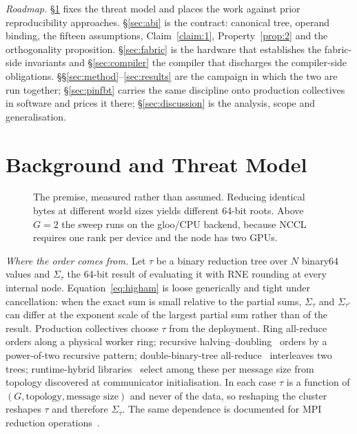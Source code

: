 \documentclass[journal,10pt]{IEEEtran}
\theoremstyle{plain}
\theoremstyle{definition}
\theoremstyle{remark}
\begin{document}
\emph{Roadmap.} \S\ref{sec:background} fixes the threat model and places the
work against prior reproducibility approaches. \S\ref{sec:abi} is the
contract: canonical tree, operand binding, the fifteen assumptions,
Claim~\ref{claim:1}, Property~\ref{prop:2} and the orthogonality proposition.
\S\ref{sec:fabric} is the hardware that establishes the fabric-side
invariants and \S\ref{sec:compiler} the compiler that discharges the
compiler-side obligations. \S\S\ref{sec:method}--\ref{sec:results} are the
campaign in which the two are run together; \S\ref{sec:pinfbt} carries the
same discipline onto production collectives in software and prices it there;
\S\ref{sec:discussion} is the analysis, scope and generalisation.




\section{Background and Threat Model}\label{sec:background}

\begin{figure}[!t]\centering

\caption{The premise, measured rather than assumed. Reducing identical bytes at different world sizes yields different 64-bit roots. Above $G{=}2$ the sweep runs on the gloo/CPU backend, because NCCL requires one rank per device and the node has two GPUs.}\label{fig:premise}
\end{figure}


\emph{Where the order comes from.} Let $\tau$ be a binary reduction tree over
$N$ binary64 values and $\Sigma_\tau$ the 64-bit result of evaluating it with
RNE rounding at every internal node. Equation~\eqref{eq:higham} is loose
generically and tight under cancellation: when the exact sum is small
relative to the partial sums, $\Sigma_\tau$ and $\Sigma_{\tau'}$ can differ
at the exponent scale of the largest partial sum rather than of the result.
Production collectives choose $\tau$ from the deployment.
Ring all-reduce~\cite{patarasuk2009bandwidth} orders along a physical worker
ring; recursive halving--doubling~\cite{rabenseifner2004optimization} orders
by a power-of-two recursive pattern; double-binary-tree
all-reduce~\cite{sanders2009two} interleaves two trees; runtime-hybrid
libraries~\cite{nccl2018,rccl2019} select among these per message size from
topology discovered at communicator initialisation. In each case $\tau$ is a
function of $(G,\text{topology},\text{message size})$ and never of the data,
so reshaping the cluster reshapes $\tau$ and therefore $\Sigma_\tau$. The
same dependence is documented for MPI reduction
operations~\cite{balaji2013reproducible}.
\end{document}
